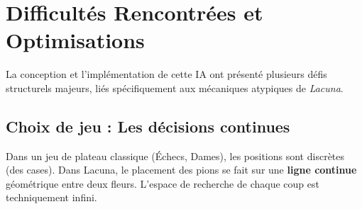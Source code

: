 \documentclass[12pt, a4paper]{article}
\begin{document}
\section{Difficultés Rencontrées et Optimisations}

La conception et l'implémentation de cette IA ont présenté plusieurs défis structurels majeurs, liés spécifiquement aux mécaniques atypiques de \textit{Lacuna}.

\subsection{Choix de jeu : Les décisions continues}
\begin{problembox}
Dans un jeu de plateau classique (Échecs, Dames), les positions sont discrètes (des cases). Dans Lacuna, le placement des pions se fait sur une \textbf{ligne continue} géométrique entre deux fleurs. L'espace de recherche de chaque coup est techniquement infini.
\end{problembox}
\end{document}
